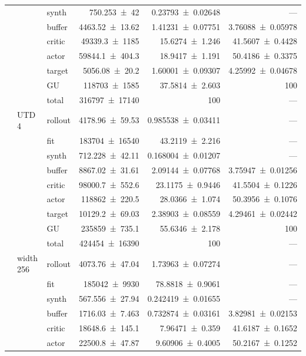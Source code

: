 {\begin{longtable}{@{}lllrrr@{}}
     &  & synth & \num{750.253+-42} & \num{0.23793+-0.02648} & --- \\
     &  & buffer & \num{4463.52+-13.62} & \num{1.41231+-0.07751} & \num{3.76088+-0.05978} \\
     &  & critic & \num{49339.3+-1185} & \num{15.6274+-1.246} & \num{41.5607+-0.4428} \\
     &  & actor & \num{59844.1+-404.3} & \num{18.9417+-1.191} & \num{50.4186+-0.3375} \\
     &  & target & \num{5056.08+-20.2} & \num{1.60001+-0.09307} & \num{4.25992+-0.04678} \\
     &  & GU & \num{118703+-1585} & \num{37.5814+-2.603} & 100 \\
     &  & total & \num{316797+-17140} & \num{100} & --- \\
    \addlinespace[2pt]
     & UTD 4 & rollout & \num{4178.96+-59.53} & \num{0.985538+-0.03411} & --- \\
     &  & fit & \num{183704+-16540} & \num{43.2119+-2.216} & --- \\
     &  & synth & \num{712.228+-42.11} & \num{0.168004+-0.01207} & --- \\
     &  & buffer & \num{8867.02+-31.61} & \num{2.09144+-0.07768} & \num{3.75947+-0.01256} \\
     &  & critic & \num{98000.7+-552.6} & \num{23.1175+-0.9446} & \num{41.5504+-0.1226} \\
     &  & actor & \num{118862+-220.5} & \num{28.0366+-1.074} & \num{50.3956+-0.1076} \\
     &  & target & \num{10129.2+-69.03} & \num{2.38903+-0.08559} & \num{4.29461+-0.02442} \\
     &  & GU & \num{235859+-735.1} & \num{55.6346+-2.178} & 100 \\
     &  & total & \num{424454+-16390} & \num{100} & --- \\
    \addlinespace[2pt]
     & width 256 & rollout & \num{4073.76+-47.04} & \num{1.73963+-0.07274} & --- \\
     &  & fit & \num{185042+-9930} & \num{78.8818+-0.9061} & --- \\
     &  & synth & \num{567.556+-27.94} & \num{0.242419+-0.01655} & --- \\
     &  & buffer & \num{1716.03+-7.463} & \num{0.732874+-0.03161} & \num{3.82981+-0.02153} \\
     &  & critic & \num{18648.6+-145.1} & \num{7.96471+-0.359} & \num{41.6187+-0.1652} \\
     &  & actor & \num{22500.8+-47.87} & \num{9.60906+-0.4005} & \num{50.2167+-0.1252} \\

\end{longtable}}
